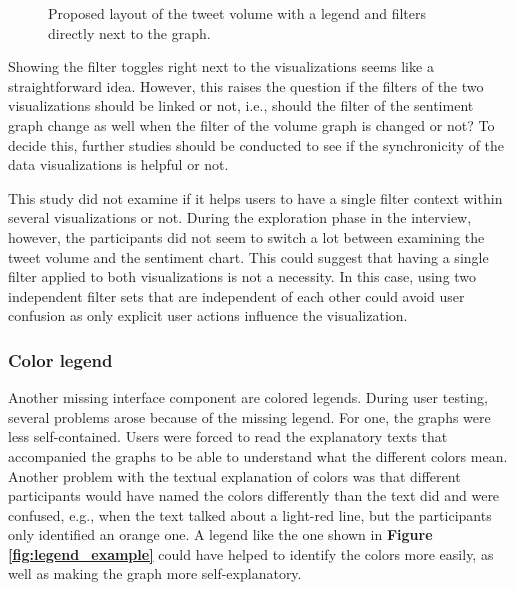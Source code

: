 \begin{figure}[h!tbp]
    \caption{Proposed layout of the tweet volume with a legend and filters directly next to the graph.}
    \label{fig:legend_and_filters}
\end{figure}

Showing the filter toggles right next to the visualizations seems like a straightforward idea. However, this raises the question if the filters of the two visualizations should be linked or not, i.e., should the filter of the sentiment graph change as well when the filter of the volume graph is changed or not? To decide this, further studies should be conducted to see if the synchronicity of the data visualizations is helpful or not.

This study did not examine if it helps users to have a single filter context within several visualizations or not. During the exploration phase in the interview, however, the participants did not seem to switch a lot between examining the tweet volume and the sentiment chart. This could suggest that having a single filter applied to both visualizations is not a necessity. In this case, using two independent filter sets that are independent of each other could avoid user confusion as only explicit user actions influence the visualization.

\subsubsection*{Color legend}
Another missing interface component are colored legends. During user testing, several problems arose because of the missing legend. For one, the graphs were less self-contained. Users were forced to read the explanatory texts that accompanied the graphs to be able to understand what the different colors mean. Another problem with the textual explanation of colors was that different participants would have named the colors differently than the text did and were confused, e.g., when the text talked about a light-red line, but the participants only identified an orange one. A legend like the one shown in \textbf{Figure \ref{fig:legend_example}} could have helped to identify the colors more easily, as well as making the graph more self-explanatory.

